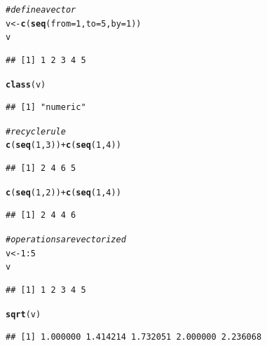 \documentclass[11pt]{article}\usepackage[]{graphicx}\usepackage[]{color}
\makeatletter
\newcommand{\hlnum}[1]{\textcolor[rgb]{0.686,0.059,0.569}{#1}}%
\newcommand{\hlcom}[1]{\textcolor[rgb]{0.678,0.584,0.686}{\textit{#1}}}%
\newcommand{\hlopt}[1]{\textcolor[rgb]{0,0,0}{#1}}%
\newcommand{\hlstd}[1]{\textcolor[rgb]{0.345,0.345,0.345}{#1}}%
\newcommand{\hlkwb}[1]{\textcolor[rgb]{0.69,0.353,0.396}{#1}}%
\newcommand{\hlkwc}[1]{\textcolor[rgb]{0.333,0.667,0.333}{#1}}%
\newcommand{\hlkwd}[1]{\textcolor[rgb]{0.737,0.353,0.396}{\textbf{#1}}}%
\newenvironment{kframe}{%
 \def\at@end@of@kframe{}%
 \ifinner\ifhmode%
  \def\at@end@of@kframe{\end{minipage}}%
  \begin{minipage}{\columnwidth}%
 \fi\fi%
 \def\FrameCommand##1{\hskip\@totalleftmargin \hskip-\fboxsep
 \colorbox{shadecolor}{##1}\hskip-\fboxsep
     \hskip-\linewidth \hskip-\@totalleftmargin \hskip\columnwidth}%
 \MakeFramed {\advance\hsize-\width
   \@totalleftmargin\z@ \linewidth\hsize
   \@setminipage}}%
 {\par\unskip\endMakeFramed%
 \at@end@of@kframe}
\newenvironment{knitrout}{}{} %
\makeatother
\begin{document}
\begin{knitrout}
\color{fgcolor}\begin{kframe}
\begin{alltt}
\hlcom{# define a vector}
\hlstd{v} \hlkwb{<-} \hlkwd{c}\hlstd{(}\hlkwd{seq}\hlstd{(}\hlkwc{from} \hlstd{=} \hlnum{1}\hlstd{,} \hlkwc{to} \hlstd{=} \hlnum{5}\hlstd{,} \hlkwc{by} \hlstd{=} \hlnum{1}\hlstd{))}
\hlstd{v}
\end{alltt}
\begin{verbatim}
## [1] 1 2 3 4 5
\end{verbatim}
\begin{alltt}
\hlkwd{class}\hlstd{(v)}
\end{alltt}
\begin{verbatim}
## [1] "numeric"
\end{verbatim}
\begin{alltt}
\hlcom{# recycle rule}
\hlkwd{c}\hlstd{(}\hlkwd{seq}\hlstd{(}\hlnum{1}\hlstd{,}\hlnum{3}\hlstd{))} \hlopt{+} \hlkwd{c}\hlstd{(}\hlkwd{seq}\hlstd{(}\hlnum{1}\hlstd{,}\hlnum{4}\hlstd{))}
\end{alltt}


{\ttfamily\noindent\color{warningcolor}{\#\# Warning in c(seq(1, 3)) + c(seq(1, 4)): longer object length is not a multiple of shorter object length}}\begin{verbatim}
## [1] 2 4 6 5
\end{verbatim}
\begin{alltt}
\hlkwd{c}\hlstd{(}\hlkwd{seq}\hlstd{(}\hlnum{1}\hlstd{,}\hlnum{2}\hlstd{))} \hlopt{+} \hlkwd{c}\hlstd{(}\hlkwd{seq}\hlstd{(}\hlnum{1}\hlstd{,}\hlnum{4}\hlstd{))}
\end{alltt}
\begin{verbatim}
## [1] 2 4 4 6
\end{verbatim}
\begin{alltt}
\hlcom{# operations are vectorized}
\hlstd{v} \hlkwb{<-} \hlnum{1}\hlopt{:}\hlnum{5}
\hlstd{v}
\end{alltt}
\begin{verbatim}
## [1] 1 2 3 4 5
\end{verbatim}
\begin{alltt}
\hlkwd{sqrt}\hlstd{(v)}
\end{alltt}
\begin{verbatim}
## [1] 1.000000 1.414214 1.732051 2.000000 2.236068
\end{verbatim}
\end{kframe}
\end{knitrout}
\end{document}
